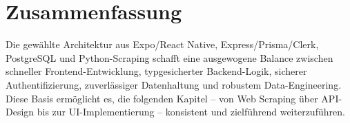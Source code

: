 \section{Zusammenfassung}
Die gewählte Architektur aus Expo/React Native, Express/Prisma/Clerk, PostgreSQL und Python-Scraping schafft eine ausgewogene Balance zwischen schneller Frontend-Entwicklung, typgesicherter Backend-Logik, sicherer Authentifizierung, zuverlässiger Datenhaltung und robustem Data-Engineering. Diese Basis ermöglicht es, die folgenden Kapitel – von Web Scraping über API-Design bis zur UI-Implementierung – konsistent und zielführend weiterzuführen.
